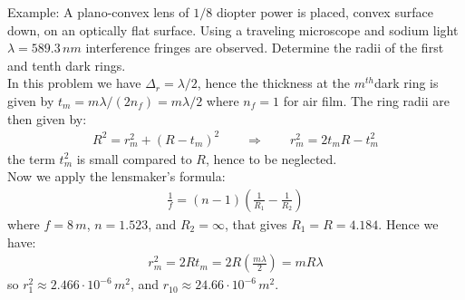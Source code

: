 \documentclass[11pt]{book}
\theoremstyle{break}
\theoremstyle{break}
\newcommand{\example}{\color{green}Example: \color{black}}
\begin{document}
\hfill\break

\example
A plano-convex lens of $1/8$ diopter power is placed, convex surface down, on an optically flat surface. Using a traveling microscope and sodium light $\lambda = 589.3\, nm$ interference fringes are
observed. Determine the radii of the first and tenth dark rings.\\

In this problem we have $\Delta_r = \lambda/2$, hence the thickness at the $m^{th}$dark ring is given by $t_m = m\lambda / (2n_f) = m\lambda / 2$ where $n_f = 1$ for air film. The ring radii are then given by:
\begin{align*}
R^2 = r_m^2 + ( R - t_m)^2 \qquad \Rightarrow \qquad r_m^2 = 2t_m R - t_m^2
\end{align*}
the term $t_m^2$ is small compared to $R$, hence to be neglected. \\
Now we apply the lensmaker's formula:
\begin{align*}
\frac{1}{f} = (n-1) \left( \frac{1}{R_1} - \frac{1}{R_2}\right)
\end{align*}
where $f = 8\, m$, $n=1.523$, and $R_2 = \infty$, that gives $R_1 = R = 4.184$. Hence we have:
\begin{align*}
r_m^2 = 2Rt_m = 2R \left( \frac{m\lambda}{2}\right) = mR\lambda
\end{align*}
so $r_1^2 \approx 2.466\cdot 10^{-6}\, m^2$, and $r_{10}\approx 24.66 \cdot 10^{-6}\, m^2$.

\newpage
\end{document}
